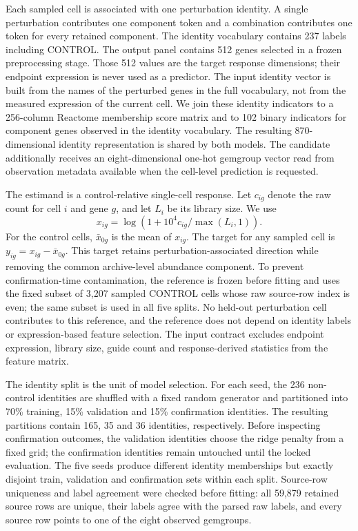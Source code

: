 \documentclass[10pt]{article}
\begin{document}
Each sampled cell is associated with one perturbation identity. A single perturbation contributes one component token and a combination contributes one token for every retained component. The identity vocabulary contains 237 labels including CONTROL. The output panel contains 512 genes selected in a frozen preprocessing stage. Those 512 values are the target response dimensions; their endpoint expression is never used as a predictor. The input identity vector is built from the names of the perturbed genes in the full vocabulary, not from the measured expression of the current cell. We join these identity indicators to a 256-column Reactome membership score matrix and to 102 binary indicators for component genes observed in the identity vocabulary. The resulting 870-dimensional identity representation is shared by both models. The candidate additionally receives an eight-dimensional one-hot gemgroup vector read from observation metadata available when the cell-level prediction is requested.

The estimand is a control-relative single-cell response. Let $c_{ig}$ denote the raw count for cell $i$ and gene $g$, and let $L_i$ be its library size. We use
\begin{equation}
 x_{ig}=\log\left(1+10^4c_{ig}/\max(L_i,1)\right).
\end{equation}
For the control cells, $\bar{x}_{0g}$ is the mean of $x_{ig}$. The target for any sampled cell is $y_{ig}=x_{ig}-\bar{x}_{0g}$. This target retains perturbation-associated direction while removing the common archive-level abundance component. To prevent confirmation-time contamination, the reference is frozen before fitting and uses the fixed subset of 3,207 sampled CONTROL cells whose raw source-row index is even; the same subset is used in all five splits. No held-out perturbation cell contributes to this reference, and the reference does not depend on identity labels or expression-based feature selection. The input contract excludes endpoint expression, library size, guide count and response-derived statistics from the feature matrix.

The identity split is the unit of model selection. For each seed, the 236 non-control identities are shuffled with a fixed random generator and partitioned into 70\% training, 15\% validation and 15\% confirmation identities. The resulting partitions contain 165, 35 and 36 identities, respectively. Before inspecting confirmation outcomes, the validation identities choose the ridge penalty from a fixed grid; the confirmation identities remain untouched until the locked evaluation. The five seeds produce different identity memberships but exactly disjoint train, validation and confirmation sets within each split. Source-row uniqueness and label agreement were checked before fitting: all 59,879 retained source rows are unique, their labels agree with the parsed raw labels, and every source row points to one of the eight observed gemgroups.
\end{document}
